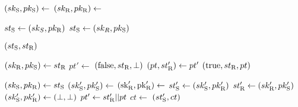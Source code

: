 \algrenewcommand\textproc{}
\algrenewcommand{}

\begin{minipage}{.5\linewidth}
  {\fontsize{8}{10}\selectfont

    \begin{algorithmic}[1]
    \State $(sk_\text{S},pk_\text{S}) \gets$ 
    \State $(sk_\text{R},pk_\text{R}) \gets$ 

    \State $st_\text{S} \gets (sk_S,pk_\text{R})$ 
    \State $st_\text{S} \gets (sk_R,pk_\text{S})$ 

    \State \Return $(st_\text{S},st_\text{R})$
    \EndProcedure

    \item[]

    \State $(sk_\text{R},pk_\text{S}) \gets st_\text{R}$ 
    \State $pt' \gets$ 
    \State \Return $(\text{false}, st_\text{R}, \perp)$
    \EndIf
    \State $(pt,st_\text{R}') \gets pt'$
    \State \Return $(\text{true},st_\text{R}, pt)$
    \EndProcedure
   
  \end{algorithmic}
  }
\end{minipage}

\begin{minipage}{.5\linewidth}
  {\fontsize{8}{10}\selectfont

  \begin{algorithmic}[1]
    \State $(sk_\text{S},pk_\text{R}) \gets st_\text{S}$ 
    \State $(sk_\text{S}',pk_\text{S}') \gets$ 
    \State $(\text{sk}_\text{R}',\text{pk}_\text{R}') \gets$ 
    \State $st_\text{S}' \gets (sk_\text{S}',pk_\text{R}')$
    \State $st_\text{R}' \gets (sk_\text{R}',pk_\text{S}')$
    \Else
    \State $(sk_\text{S}',pk_\text{R}') \gets (\perp,\perp)$
    \EndIf
    \State $pt' \gets st_\text{R}' || pt$
    \State $ct \gets$ 
    \State \Return $(st_\text{S}', ct)$
    \EndProcedure
    
  \end{algorithmic}
  }
\end{minipage}
